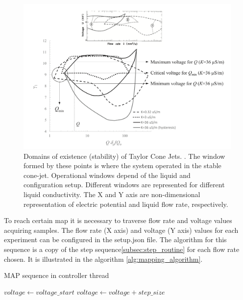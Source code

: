     \begin{figure}[H]
        \center
        \includegraphics[width=13cm]{Figuras/ganan_calvo_map.png}
        \caption{Domains of existence (stability) of Taylor Cone Jets. \cite{gananCalvo} . The window formed by these points is where the system operated in the stable cone-jet. Operational windows depend of the liquid and configuration setup. Different windows are represented for different liquid conductivity. The X and Y axis are non-dimensional representation of electric potential and liquid flow rate, respectively.}
        \label{fig:ganan_calvo_fig}
    \end{figure}

To reach certain map it is necessary to traverse flow rate and voltage values acquiring samples.
The flow rate (X axis) and voltage (Y axis) values for each experiment can be configured in the setup.json file.
The algorithm for this sequence is a copy of the step sequence\ref{subsec:step_routine} for each flow rate chosen. It is illustrated in the algorithm \ref{alg:mapping_algorithm}.


    \begin{algorithm}
        \caption{MAP sequence in controller thread}\label{alg:mapping_algorithm}
        \begin{algorithmic}
              
                \State {}
                \State $voltage \gets voltage\_start$
                 
                    \State {}
                    \State {}
                    \State $voltage \gets voltage + step\_size$
                \EndWhile
            \EndFor
        \EndProcedure

        \end{algorithmic}
    \end{algorithm}

